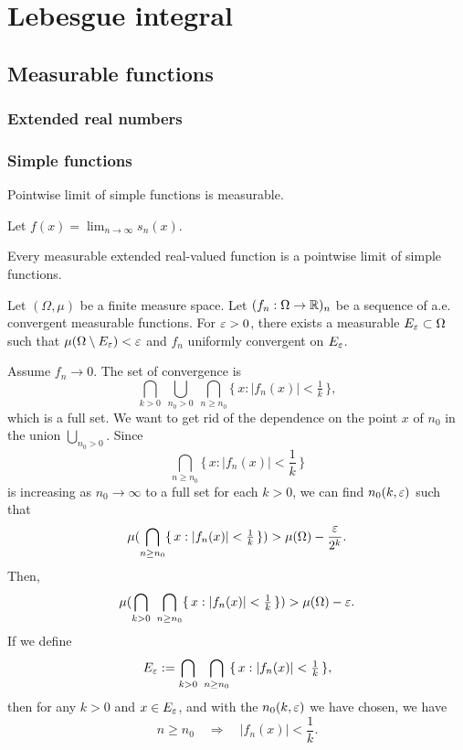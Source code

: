 \documentclass{../note}
\begin{document}
\part{Lebesgue integral}


\chapter{Measurable functions}

\section{Extended real numbers}


\section{Simple functions}
Pointwise limit of simple functions is measurable.
\begin{pf}
Let $f(x)=\lim_{n\to\infty}s_n(x)$.

\end{pf}

Every measurable extended real-valued function is a pointwise limit of simple functions.





\begin{prb}
Let $(\Omega,\mu)$ be a finite measure space.
Let $(f_n:\Omega\to\mathbb{R})_n$ be a sequence of a.e. convergent measurable functions.
For $\varepsilon>0$, there exists a measurable $E_\varepsilon\subset\Omega$ such that $\mu(\Omega\setminus E_\varepsilon)<\varepsilon$ and $f_n$ uniformly convergent on $E_\varepsilon$.
\end{prb}
\begin{pf}
Assume $f_n\to0$.
The set of convergence is
\[\bigcap_{k>0}\ \bigcup_{n_0>0}\ \bigcap_{n\ge n_0}\{\,x:|f_n(x)|<\tfrac1k\,\},\]
which is a full set.
We want to get rid of the dependence on the point $x$ of $n_0$ in the union $\bigcup_{n_0>0}$.
Since
\[\bigcap_{n\ge n_0}\{\,x:|f_n(x)|<\frac1k\,\}\]
is increasing as $n_0\to\infty$ to a full set for each $k>0$, we can find $n_0(k,\varepsilon)$ such that
\[\mu(\bigcap_{n\ge n_0}\{\,x:|f_n(x)|<\tfrac1k\,\})>\mu(\Omega)-\frac{\varepsilon}{2^k}.\]
Then,
\[\mu(\bigcap_{k>0}\ \bigcap_{n\ge n_0}\{\,x:|f_n(x)|<\tfrac1k\,\})>\mu(\Omega)-\varepsilon.\]
If we define
\[E_\e:=\bigcap_{k>0}\ \bigcap_{n\ge n_0}\{\,x:|f_n(x)|<\tfrac1k\,\},\]
then for any $k>0$ and $x\in E_\varepsilon$, and with the $n_0(k,\varepsilon)$ we have chosen,
we have
\[n\ge n_0\quad\Rightarrow\quad |f_n(x)|<\frac1k.\]
\end{pf}
\end{document}
